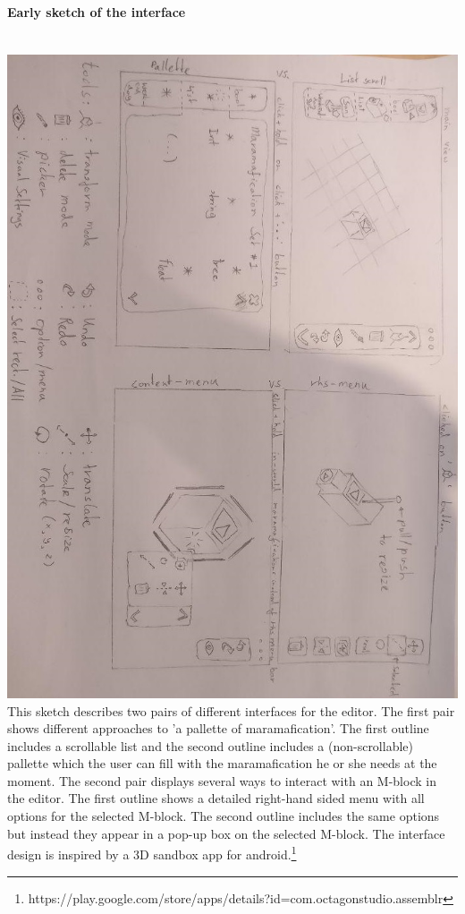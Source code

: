 \documentclass[10pt]{extarticle} %
\newcommand{\myparagraph}[1]{\paragraph{#1}\mbox{}\\} %
\begin{document}
    \myparagraph{Early sketch of the interface}
    \includegraphics[width=1\linewidth]{marama-view-sketch.jpg}
    This sketch describes two pairs of different interfaces for the editor.
    The first pair shows different approaches to 'a pallette of maramafication'.
    The first outline includes a scrollable list and the second outline includes a (non-scrollable) pallette which the user can fill with the maramafication he or she needs at the moment.
    The second pair displays several ways to interact with an M-block in the editor.
    The first outline shows a detailed right-hand sided menu with all options for the selected M-block.
    The second outline includes the same options but instead they appear in a pop-up box on the selected M-block.
    The interface design is inspired by a 3D sandbox app for android.\footnote[1]{https://play.google.com/store/apps/details?id=com.octagonstudio.assemblr}
\end{document}
